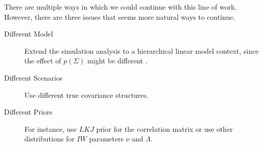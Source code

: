 \documentclass[a4paper]{article}
\begin{document}
There are multiple ways in which we could continue with this line of work. However, there are three issues that seems more natural ways to continue. 
\begin{description}
\item[Different Model] Extend the simulation analysis to a hierarchical linear model context, since the effect of $p(\Sigma)$ might be different \citep{gelman2006prior}. 
\item[Different Scenarios]  Use different true covariance structures. 
\item[Different Priors] For instance, use $LKJ$ prior for the correlation matrix or use other distributions for $IW$ parameters $\nu$ and $\Lambda$.
\end{description}


      
      
\end{document}
